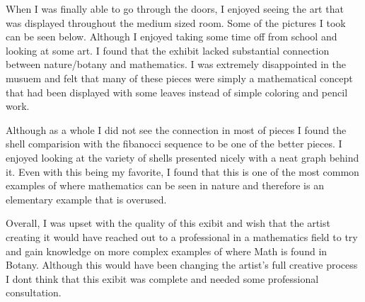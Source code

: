 \documentclass{article}
\begin{document}
When I was finally able to go through the doors, I enjoyed seeing the art that was displayed throughout the medium sized room.
Some of the pictures I took can be seen below. Although I enjoyed taking some time off from school and looking at some art. 
I found that the exhibit lacked substantial connection between nature/botany and mathematics. I was extremely disappointed
in the musuem and felt that many of these pieces were simply a mathematical concept that had been displayed with some
leaves instead of simple coloring and pencil work. 

Although as a whole I did not see the connection in most of pieces I found the shell comparision with the fibanocci sequence 
to be one of the better pieces. I enjoyed looking at the variety of shells presented nicely with a neat graph behind it.
Even with this being my favorite, I found that this is one of the most common examples of 
where mathematics can be seen in nature and therefore is an elementary example that is overused. 

Overall, I was upset with the quality of this exibit and wish that the artist creating it would have reached out to a 
professional in a mathematics field to try and gain knowledge on more complex examples of where Math is found in Botany.
Although this would have been changing the artist's full creative process I dont think that this exibit was complete and needed
some professional consultation.  


\begin{figure}\centering
    \hfill
    \par 
\end{figure}

\end{document}

